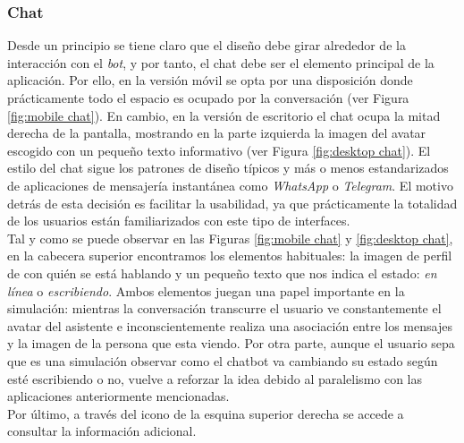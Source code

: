 \subsubsection{Chat}
Desde un principio se tiene claro que el diseño debe girar alrededor de la interacción con el \textit{bot}, y por tanto, el chat debe ser el elemento principal de la aplicación. Por ello, en la versión móvil se opta por una disposición donde prácticamente todo el espacio es ocupado por la conversación (ver Figura \ref{fig:mobile chat}). En cambio, en la versión de escritorio el chat ocupa la mitad derecha de la pantalla, mostrando en la parte izquierda la imagen del avatar escogido con un pequeño texto informativo (ver Figura \ref{fig:desktop chat}). El estilo del chat sigue los patrones de diseño típicos y más o menos estandarizados de aplicaciones de mensajería instantánea como \textit{WhatsApp} o \textit{Telegram}. El motivo detrás de esta decisión es facilitar la usabilidad, ya que prácticamente la totalidad de los usuarios están familiarizados con este tipo de interfaces.\\

Tal y como se puede observar en las Figuras \ref{fig:mobile chat} y \ref{fig:desktop chat}, en la cabecera superior encontramos los elementos habituales: la imagen de perfil de con quién se está hablando y un pequeño texto que nos indica el estado: \textit{en línea} o \textit{escribiendo}. Ambos elementos juegan una papel importante en la simulación: mientras la conversación transcurre el usuario ve constantemente el avatar del asistente e inconscientemente realiza una asociación entre los mensajes y la imagen de la persona que esta viendo. Por otra parte, aunque el usuario sepa que es una simulación observar como el chatbot va cambiando su estado según esté escribiendo o no, vuelve a reforzar la idea debido al paralelismo con las aplicaciones anteriormente mencionadas.\\

Por último, a través del icono de la esquina superior derecha se accede a consultar la información adicional.\\

